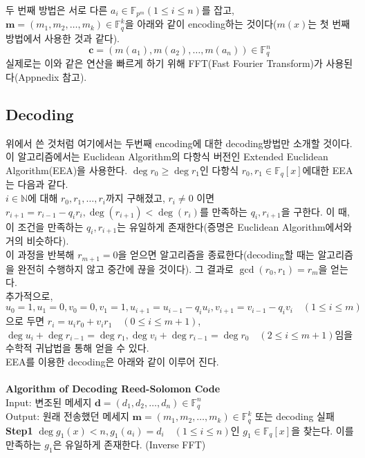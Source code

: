 \documentclass[11pt]{article}
\begin{document}
두 번째 방법은 서로 다른 $a_{i}\in\mathbb{F}_{p^{m}}(1\leq i\leq n)$를 잡고, $\mathbf{m}=(m_{1},m_{2},\dots,m_{k})\in\mathbb{F}_{q}^{k}$을 아래와 같이 encoding하는 것이다($m(x)$는 첫 번째 방법에서 사용한 것과 같다).
\begin{displaymath}
\mathbf{c}=\left(m(a_{1}),m(a_{2}),\dots,m(a_{n})\right)\in\mathbb{F}_{q}^{n}
\end{displaymath}
실제로는 이와 같은 연산을 빠르게 하기 위해 FFT(Fast Fourier Transform)가 사용된다(Appnedix 참고).
\subsection{Decoding}
위에서 쓴 것처럼 여기에서는 두번째 encoding에 대한 decoding방법만 소개할 것이다. 이 알고리즘에서는 Euclidean Algorithm의 다항식 버전인
Extended Euclidean Algorithm(EEA)을 사용한다. $\deg r_{0}\geq\deg r_{1}$인 다항식 $r_{0},r_{1}\in\mathbb{F}_{q}[x]$에대한 EEA는 다음과 같다.\\
$i\in\mathbb{N}$에 대해 $r_{0},r_{1},\dots,r_{i}$까지 구해졌고, $r_{i}\neq0$ 이면 $r_{i+1}=r_{i-1}-q_{i}r_{i},\deg(r_{i+1})<\deg(r_{i})$를 만족하는 $q_{i},r_{i+1}$을 구한다. 이 때,  이 조건을 만족하는 $q_{i},r_{i+1}$는 유일하게 존재한다(증명은 Euclidean Algorithm에서와 거의 비슷하다).\\
 이 과정을 반복해 $r_{m+1}=0$을 얻으면 알고리즘을 종료한다(decoding할 때는 알고리즘을 완전히 수행하지 않고 중간에 끊을 것이다). 그 결과로 $\gcd(r_{0},r_{1})=r_{m}$을 얻는다.\\
 추가적으로, $u_{0}=1,u_{1}=0,v_{0}=0,v_{1}=1,u_{i+1}=u_{i-1}-q_{i}u_{i},v_{i+1}=v_{i-1}-q_{i}v_{i}\quad(1\leq i\leq m)$으로 두면 $r_{i} = u_{i}r_{0}+v_{i}r_{1}\quad(0\leq i\leq m+1)$, $\deg u_{i}+\deg r_{i-1}=\deg r_{1}, \deg v_{i}+\deg r_{i-1}=\deg r_{0}\quad(2\leq i\leq m+1)$임을 수학적 귀납법을 통해 얻을 수 있다.\\
 EEA를 이용한 decoding은 아래와 같이 이루어 진다.\\\\
{\large \textbf{Algorithm of Decoding Reed-Solomon Code}}\\
 Input: 변조된 메세지 $\mathbf{d}=(d_{1},d_{2},\dots,d_{n})\in\mathbb{F}_{q}^{n}$\\
 Output: 원래 전송했던 메세지  $\mathbf{m}=(m_{1},m_{2},\dots,m_{k})\in\mathbb{F}_{q}^{k}$ 또는 decoding 실패\\
\textbf{Step1} $\deg g_{1}(x)< n, g_{1}(a_{i})=d_{i}\quad(1\leq i\leq n)$인 $g_{1}\in\mathbb{F}_{q}[x]$을 찾는다. 이를 만족하는 $g_{1}$은 유일하게 존재한다. (Inverse FFT)\\
\end{document}
